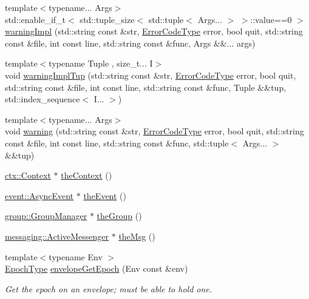 \begin{DoxyCompactItemize}
\item 
{\footnotesize template$<$typename... Args$>$ }\\std\+::enable\+\_\+if\+\_\+t$<$ std\+::tuple\+\_\+size$<$ std\+::tuple$<$ Args... $>$ $>$\+::value==0 $>$ \hyperlink{namespacevt_a118ef4729cf1e1516a3efef8da49efbf}{warning\+Impl} (std\+::string const \&str, \hyperlink{namespacevt_a793764d753923abc3d32929870beb485}{Error\+Code\+Type} error, bool quit, std\+::string const \&file, int const line, std\+::string const \&func, Args \&\&... args)
\item 
{\footnotesize template$<$typename Tuple , size\+\_\+t... I$>$ }\\void \hyperlink{namespacevt_af998935c41a6f414a373f182156d72e3}{warning\+Impl\+Tup} (std\+::string const \&str, \hyperlink{namespacevt_a793764d753923abc3d32929870beb485}{Error\+Code\+Type} error, bool quit, std\+::string const \&file, int const line, std\+::string const \&func, Tuple \&\&tup, std\+::index\+\_\+sequence$<$ I... $>$)
\item 
{\footnotesize template$<$typename... Args$>$ }\\void \hyperlink{namespacevt_af11de63df5da8fa58bd668f4e5026a72}{warning} (std\+::string const \&str, \hyperlink{namespacevt_a793764d753923abc3d32929870beb485}{Error\+Code\+Type} error, bool quit, std\+::string const \&file, int const line, std\+::string const \&func, std\+::tuple$<$ Args... $>$ \&\&tup)
\item 
\hyperlink{structvt_1_1ctx_1_1_context}{ctx\+::\+Context} $\ast$ \hyperlink{namespacevt_a26551fe0e6e6a1371111df5b12c7e92c}{the\+Context} ()
\item 
\hyperlink{structvt_1_1event_1_1_async_event}{event\+::\+Async\+Event} $\ast$ \hyperlink{namespacevt_aa297fcaadc8a330890eb90c5b0081ec5}{the\+Event} ()
\item 
\hyperlink{structvt_1_1group_1_1_group_manager}{group\+::\+Group\+Manager} $\ast$ \hyperlink{namespacevt_a4548473dce44fb654400009e2b2fe64e}{the\+Group} ()
\item 
\hyperlink{structvt_1_1messaging_1_1_active_messenger}{messaging\+::\+Active\+Messenger} $\ast$ \hyperlink{namespacevt_aeafd31f866aeb4dc6fc2f6ee97136350}{the\+Msg} ()
\item 
{\footnotesize template$<$typename Env $>$ }\\\hyperlink{namespacevt_a985a5adf291c34a3ca263b3378388236}{Epoch\+Type} \hyperlink{namespacevt_ad5495e7900227550b44837e899c5bb13}{envelope\+Get\+Epoch} (Env const \&env)
\begin{DoxyCompactList}\small\item\em Get the epoch on an envelope; must be able to hold one. \end{DoxyCompactList}\item 

\end{DoxyCompactItemize}
